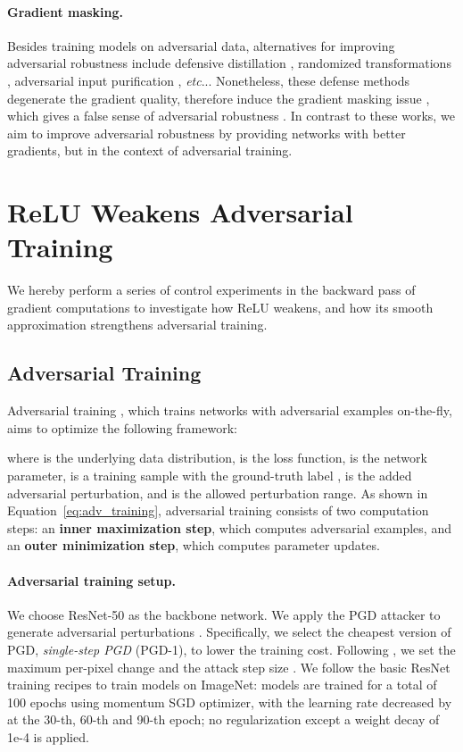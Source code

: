 \documentclass{article}
\makeatletter
\DeclareRobustCommand\onedot{\futurelet\@let@token\@onedot}
\def\@onedot{\ifx\@let@token.\else.\null\fi\xspace}
\def\etc{\emph{etc}\onedot} \def\vs{\emph{vs}\onedot}
\makeatother
\begin{document}
\paragraph{Gradient masking.} 
Besides training models on adversarial data, alternatives for improving adversarial robustness include defensive distillation \cite{Papernot2016}, randomized transformations \cite{Xie2018,Dhillon2018,liu2018towards,wang2018defensive,bhagoji2018enhancing},  adversarial input purification \cite{Guo2018,prakash2018,meng2017magnet,song2017pixeldefend,samangouei2018defense,Liao2018,bhagoji2018enhancing}, \etc. Nonetheless, these defense methods degenerate the gradient quality, therefore induce the gradient masking issue \cite{papernot2017practical}, which gives a false sense of adversarial robustness \cite{Athalye2018}. In contrast to these works, we aim to improve adversarial robustness by providing networks with better gradients, but in the context of adversarial training.


\section{ReLU Weakens Adversarial Training} \label{sec:motivation}
We hereby perform a series of control experiments in the backward pass of gradient computations to investigate how ReLU weakens, and how its smooth approximation strengthens adversarial training. 

\subsection{Adversarial Training}
Adversarial training \cite{Goodfellow2015,Madry2018}, which trains networks with adversarial examples on-the-fly, aims to optimize the following framework:

where  is the underlying data distribution,   is the loss function,  is the network parameter,  is a training sample with the ground-truth label ,   is the added adversarial perturbation, and  is the allowed perturbation range. 
As shown in Equation~\eqref{eq:adv_training}, adversarial training consists of two computation steps: an \textbf{inner maximization step}, which computes adversarial examples, and an \textbf{outer minimization step}, which computes parameter updates.

\paragraph{Adversarial training setup.} We choose ResNet-50 \cite{He2016} as the backbone network. We apply the PGD attacker \cite{Madry2018} to generate adversarial perturbations . Specifically, we select the cheapest version of PGD, \emph{single-step PGD} (PGD-1), to lower the training cost. Following \cite{Shafahi2019,wong2020fast}, we set the maximum per-pixel change  and the attack step size . We follow the basic ResNet training recipes to train models on ImageNet: models are trained for a total of 100 epochs using momentum SGD optimizer, with the learning rate decreased by  at the 30-th, 60-th and 90-th epoch; no regularization except a weight decay of 1e-4 is applied.
\end{document}
